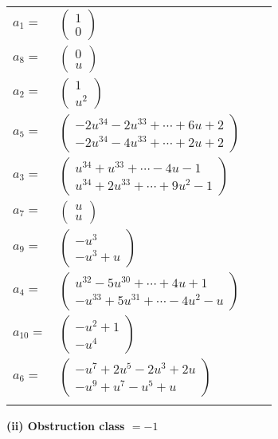 \documentclass[1p]{elsarticle_modified}
\theoremstyle{definition}
\begin{document}
\begin{tabular}{m{7pt} m{180pt} m{7pt} m{180pt} }
\flushright $a_{1}=$&$\begin{pmatrix}1\\0\end{pmatrix}$ \\
\flushright $a_{8}=$&$\begin{pmatrix}0\\u\end{pmatrix}$ \\
\flushright $a_{2}=$&$\begin{pmatrix}1\\u^2\end{pmatrix}$ \\
\flushright $a_{5}=$&$\begin{pmatrix}-2 u^{34}-2 u^{33}+\cdots+6 u+2\\-2 u^{34}-4 u^{33}+\cdots+2 u+2\end{pmatrix}$ \\
\flushright $a_{3}=$&$\begin{pmatrix}u^{34}+u^{33}+\cdots-4 u-1\\u^{34}+2 u^{33}+\cdots+9 u^2-1\end{pmatrix}$ \\
\flushright $a_{7}=$&$\begin{pmatrix}u\\u\end{pmatrix}$ \\
\flushright $a_{9}=$&$\begin{pmatrix}- u^3\\- u^3+u\end{pmatrix}$ \\
\flushright $a_{4}=$&$\begin{pmatrix}u^{32}-5 u^{30}+\cdots+4 u+1\\- u^{33}+5 u^{31}+\cdots-4 u^2- u\end{pmatrix}$ \\
\flushright $a_{10}=$&$\begin{pmatrix}- u^2+1\\- u^4\end{pmatrix}$ \\
\flushright $a_{6}=$&$\begin{pmatrix}- u^7+2 u^5-2 u^3+2 u\\- u^9+u^7- u^5+u\end{pmatrix}$\\&\end{tabular}
\flushleft \textbf{(ii) Obstruction class $= -1$}\\~\\
\end{document}
